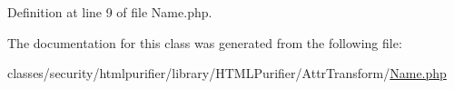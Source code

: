 Definition at line 9 of file Name.\+php.



The documentation for this class was generated from the following file\+:\begin{DoxyCompactItemize}
\item 
classes/security/htmlpurifier/library/\+H\+T\+M\+L\+Purifier/\+Attr\+Transform/\hyperlink{AttrTransform_2Name_8php}{Name.\+php}\end{DoxyCompactItemize}
